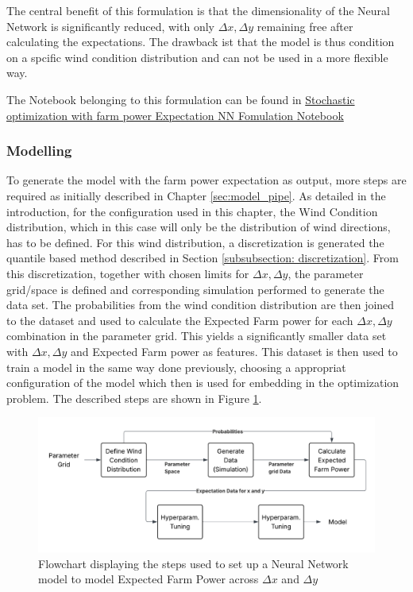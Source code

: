 The central benefit of this formulation is that the dimensionality of the Neural Network is significantly reduced, with only  \(\Delta x, \Delta y\) remaining free after calculating the expectations. The drawback ist that the model is thus condition on a spcific wind condition distribution and can not be used in a more flexible way.


The Notebook belonging to this formulation can be found in \href{https://github.com/schmeti/uc3m_TFM_wind_farm_optimization_codebase/blob/main/Windfarm_power_modelling/0_two_turbine_problem_constrLearn_probweightedt_expNN.ipynb}{Stochastic optimization with farm power Expectation NN Fomulation Notebook} \cite{schmetz2025twoturbine_stoch2}

\subsubsection{Modelling}

To generate the model with the farm power expectation as output, more steps are required as initially described in Chapter \ref{sec:model_pipe}. As detailed in the introduction, for the configuration used in this chapter, the Wind Condition distribution, which in this case will only be the distribution of wind directions, has to be defined. For this wind distribution, a discretization is generated the quantile based method described in Section \ref{subsubsection: discretization}. From this discretization, together with chosen limits for \(\Delta x, \Delta y\), the parameter grid/space is defined and corresponding simulation performed to generate the data set. The probabilities from the wind condition distribution are then joined to the dataset and used to calculate the Expected Farm power for each \(\Delta x, \Delta y\) combination in the parameter grid. This yields a significantly smaller data set with \(\Delta x, \Delta y\) and Expected Farm power as features. This dataset is then used to train a model in the same way done previously, choosing a appropriat configuration of the model which then is used for embedding in the optimization problem. The described steps are shown in Figure \ref{fig:stoch2_model_flow}.


\begin{figure}[h] 
	\centering
	\includegraphics[width=1\textwidth]{../figures/optimization/stoch2/stoch2_model_flow.png} 
	\caption{Flowchart displaying the steps used to set up a Neural Network model to model Expected Farm Power across \(\Delta x\) and  \(\Delta y\)}
	\label{fig:stoch2_model_flow}
\end{figure} 

